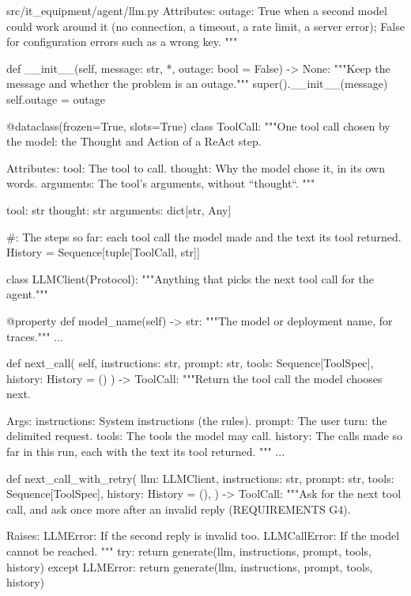 \documentclass[11pt,letterpaper]{article}
\renewcommand{\_}{\textunderscore\allowbreak}
\begin{document}
\begin{codebox}{src/it_equipment/agent/llm.py}
    Attributes:
        outage: True when a second model could work around it (no connection, a timeout, a
            rate limit, a server error); False for configuration errors such as a wrong key.
    """

    def __init__(self, message: str, *, outage: bool = False) -> None:
        """Keep the message and whether the problem is an outage."""
        super().__init__(message)
        self.outage = outage


@dataclass(frozen=True, slots=True)
class ToolCall:
    """One tool call chosen by the model: the Thought and Action of a ReAct step.

    Attributes:
        tool: The tool to call.
        thought: Why the model chose it, in its own words.
        arguments: The tool's arguments, without ``thought``.
    """

    tool: str
    thought: str
    arguments: dict[str, Any]


#: The steps so far: each tool call the model made and the text its tool returned.
History = Sequence[tuple[ToolCall, str]]


class LLMClient(Protocol):
    """Anything that picks the next tool call for the agent."""

    @property
    def model_name(self) -> str:
        """The model or deployment name, for traces."""
        ...

    def next_call(
        self, instructions: str, prompt: str, tools: Sequence[ToolSpec], history: History = ()
    ) -> ToolCall:
        """Return the tool call the model chooses next.

        Args:
            instructions: System instructions (the rules).
            prompt: The user turn: the delimited request.
            tools: The tools the model may call.
            history: The calls made so far in this run, each with the text its tool returned.
        """
        ...


def next_call_with_retry(
    llm: LLMClient,
    instructions: str,
    prompt: str,
    tools: Sequence[ToolSpec],
    history: History = (),
) -> ToolCall:
    """Ask for the next tool call, and ask once more after an invalid reply (REQUIREMENTS G4).

    Raises:
        LLMError: If the second reply is invalid too.
        LLMCallError: If the model cannot be reached.
    """
    try:
        return generate(llm, instructions, prompt, tools, history)
    except LLMError:
        return generate(llm, instructions, prompt, tools, history)



\end{codebox}
\end{document}
